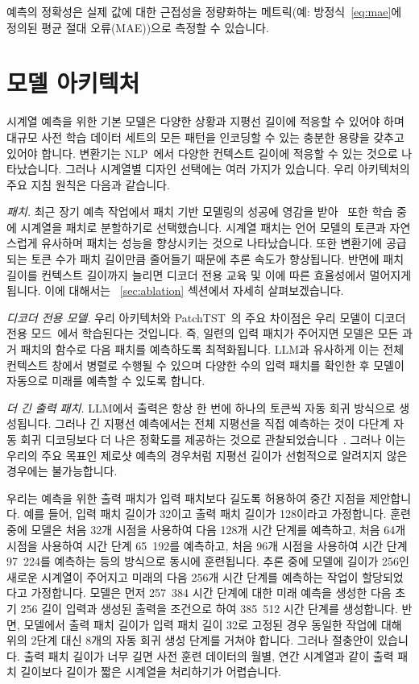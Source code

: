 \documentclass{article}
\begin{document}
예측의 정확성은 실제 값에 대한 근접성을 정량화하는 메트릭(예: 방정식~\ref{eq:mae}에 정의된 평균 절대 오류(MAE))으로 측정할 수 있습니다.

\section{모델 아키텍처}
\label{sec:model}
시계열 예측을 위한 기본 모델은 다양한 상황과 지평선 길이에 적응할 수 있어야 하며 대규모 사전 학습 데이터 세트의 모든 패턴을 인코딩할 수 있는 충분한 용량을 갖추고 있어야 합니다. 변환기는 NLP~\citep{radford2019language}에서 다양한 컨텍스트 길이에 적응할 수 있는 것으로 나타났습니다. 그러나 시계열별 디자인 선택에는 여러 가지가 있습니다. 우리 아키텍처의 주요 지침 원칙은 다음과 같습니다.

{\it 패치.} 최근 장기 예측 작업에서 패치 기반 모델링의 성공에 영감을 받아~\citep{nie2022time} 또한 학습 중에 시계열을 패치로 분할하기로 선택했습니다. 시계열 패치는 언어 모델의 토큰과 자연스럽게 유사하며 패치는 성능을 향상시키는 것으로 나타났습니다. 또한 변환기에 공급되는 토큰 수가 패치 길이만큼 줄어들기 때문에 추론 속도가 향상됩니다. 반면에 패치 길이를 컨텍스트 길이까지 늘리면 디코더 전용 교육 및 이에 따른 효율성에서 멀어지게 됩니다. 이에 대해서는 ~\ref{sec:ablation} 섹션에서 자세히 살펴보겠습니다.

{\it 디코더 전용 모델.} 우리 아키텍처와 PatchTST~\citep{nie2022time}의 주요 차이점은 우리 모델이 디코더 전용 모드~\citep{liu2018generating}에서 학습된다는 것입니다. 즉, 일련의 입력 패치가 주어지면 모델은 모든 과거 패치의 함수로 다음 패치를 예측하도록 최적화됩니다. LLM과 유사하게 이는 전체 컨텍스트 창에서 병렬로 수행될 수 있으며 다양한 수의 입력 패치를 확인한 후 모델이 자동으로 미래를 예측할 수 있도록 합니다.

{\it 더 긴 출력 패치.} LLM에서 출력은 항상 한 번에 하나의 토큰씩 자동 회귀 방식으로 생성됩니다. 그러나 긴 지평선 예측에서는 전체 지평선을 직접 예측하는 것이 다단계 자동 회귀 디코딩보다 더 나은 정확도를 제공하는 것으로 관찰되었습니다~\citep{zeng2022transformers}. 그러나 이는 우리의 주요 목표인 제로샷 예측의 경우처럼 지평선 길이가 선험적으로 알려지지 않은 경우에는 불가능합니다.

우리는 예측을 위한 출력 패치가 입력 패치보다 길도록 허용하여 중간 지점을 제안합니다. 예를 들어, 입력 패치 길이가 32이고 출력 패치 길이가 128이라고 가정합니다. 훈련 중에 모델은 처음 32개 시점을 사용하여 다음 128개 시간 단계를 예측하고, 처음 64개 시점을 사용하여 시간 단계 65~192를 예측하고, 처음 96개 시점을 사용하여 시간 단계 97~224를 예측하는 등의 방식으로 동시에 훈련됩니다. 추론 중에 모델에 길이가 256인 새로운 시계열이 주어지고 미래의 다음 256개 시간 단계를 예측하는 작업이 할당되었다고 가정합니다. 모델은 먼저 257~384 시간 단계에 대한 미래 예측을 생성한 다음 초기 256 길이 입력과 생성된 출력을 조건으로 하여 385~512 시간 단계를 생성합니다. 반면, 모델에서 출력 패치 길이가 입력 패치 길이 32로 고정된 경우 동일한 작업에 대해 위의 2단계 대신 8개의 자동 회귀 생성 단계를 거쳐야 합니다. 그러나 절충안이 있습니다. 출력 패치 길이가 너무 길면 사전 훈련 데이터의 월별, 연간 시계열과 같이 출력 패치 길이보다 길이가 짧은 시계열을 처리하기가 어렵습니다.
\end{document}
